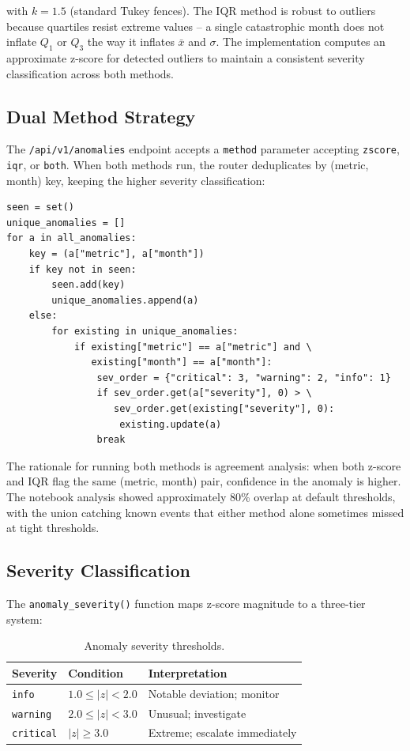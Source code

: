 with $k = 1.5$ (standard Tukey fences). The IQR method is robust to outliers because quartiles resist extreme values -- a single catastrophic month does not inflate $Q_1$ or $Q_3$ the way it inflates $\bar{x}$ and $\sigma$. The implementation computes an approximate z-score for detected outliers to maintain a consistent severity classification across both methods.

\subsection{Dual Method Strategy}

The \texttt{/api/v1/anomalies} endpoint accepts a \texttt{method} parameter accepting \texttt{zscore}, \texttt{iqr}, or \texttt{both}. When both methods run, the router deduplicates by (metric, month) key, keeping the higher severity classification:

\begin{lstlisting}[style=python, caption={Deduplication logic in anomalies router.}]
seen = set()
unique_anomalies = []
for a in all_anomalies:
    key = (a["metric"], a["month"])
    if key not in seen:
        seen.add(key)
        unique_anomalies.append(a)
    else:
        for existing in unique_anomalies:
            if existing["metric"] == a["metric"] and \
               existing["month"] == a["month"]:
                sev_order = {"critical": 3, "warning": 2, "info": 1}
                if sev_order.get(a["severity"], 0) > \
                   sev_order.get(existing["severity"], 0):
                    existing.update(a)
                break
\end{lstlisting}

The rationale for running both methods is agreement analysis: when both z-score and IQR flag the same (metric, month) pair, confidence in the anomaly is higher. The notebook analysis showed approximately 80\% overlap at default thresholds, with the union catching known events that either method alone sometimes missed at tight thresholds.

\subsection{Severity Classification}

The \texttt{anomaly\_severity()} function maps z-score magnitude to a three-tier system:

\begin{table}[h]
\centering
\caption{Anomaly severity thresholds.}
\begin{tabular}{lll}
\toprule
\textbf{Severity} & \textbf{Condition} & \textbf{Interpretation} \\
\midrule
\texttt{info}     & $1.0 \leq |z| < 2.0$  & Notable deviation; monitor \\
\texttt{warning}  & $2.0 \leq |z| < 3.0$  & Unusual; investigate \\
\texttt{critical} & $|z| \geq 3.0$        & Extreme; escalate immediately \\
\bottomrule
\end{tabular}
\label{tab:anomaly-severity}
\end{table}

